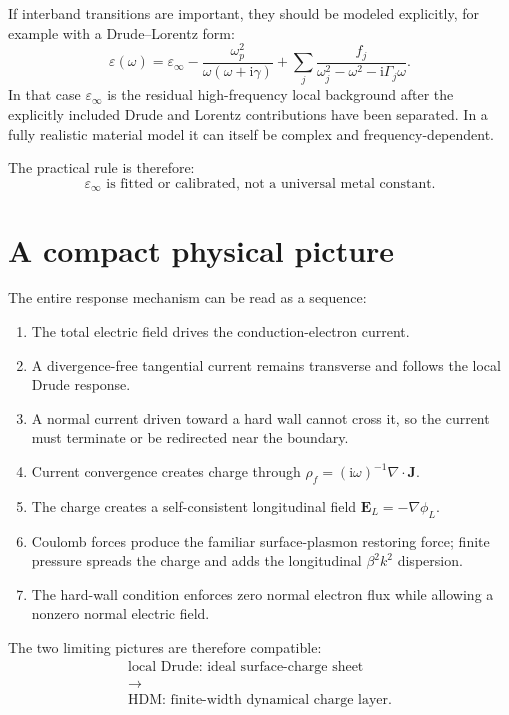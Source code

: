 \documentclass[11pt,a4paper]{article}
\newcommand{\E}{\mathbf E}
\newcommand{\J}{\mathbf J}
\newcommand{\ii}{\mathrm i}
\newcommand{\eps}{\varepsilon}
\newcommand{\epsinf}{\varepsilon_\infty}
\newcommand{\omegap}{\omega_p}
\begin{document}
If interband transitions are important, they should be modeled explicitly,
for example with a Drude--Lorentz form:
\begin{equation}
    \eps(\omega)
    =\epsinf-
    \frac{\omegap^2}{\omega(\omega+\ii\gamma)}
    +\sum_j\frac{f_j}
    {\omega_j^2-\omega^2-\ii\Gamma_j\omega}.
    \label{eq:drude-lorentz}
\end{equation}
In that case \(\epsinf\) is the residual high-frequency local background
after the explicitly included Drude and Lorentz contributions have been
separated.  In a fully realistic material model it can itself be complex and
frequency-dependent.

The practical rule is therefore:
\begin{equation}
    \boxed{\epsinf\text{ is fitted or calibrated, not a universal metal constant.}}
    \label{eq:epsinf-rule}
\end{equation}

\section{A compact physical picture}

The entire response mechanism can be read as a sequence:
\begin{enumerate}
    \item The total electric field drives the conduction-electron current.
    \item A divergence-free tangential current remains transverse and follows
    the local Drude response.
    \item A normal current driven toward a hard wall cannot cross it, so the
    current must terminate or be redirected near the boundary.
    \item Current convergence creates charge through
    \(\rho_f=(\ii\omega)^{-1}\nabla\!\cdot\!\J\).
    \item The charge creates a self-consistent longitudinal field
    \(\E_L=-\nabla\phi_L\).
    \item Coulomb forces produce the familiar surface-plasmon restoring force;
    finite pressure spreads the charge and adds the longitudinal \(\beta^2k^2\)
    dispersion.
    \item The hard-wall condition enforces zero normal electron flux while
    allowing a nonzero normal electric field.
\end{enumerate}

The two limiting pictures are therefore compatible:
\begin{equation}
    \boxed{
    \begin{gathered}
      \text{local Drude: ideal surface-charge sheet}\\[-1mm]
      \longrightarrow\\[-1mm]
      \text{HDM: finite-width dynamical charge layer}.
    \end{gathered}
    }
    \label{eq:final-picture}
\end{equation}
\end{document}
